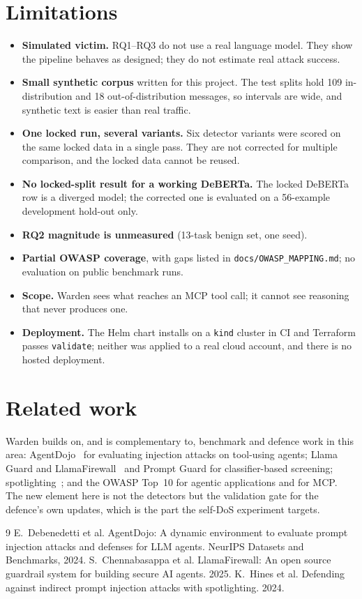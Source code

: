\documentclass[11pt,a4paper]{article}
\begin{document}
\section{Limitations}\label{sec:limits}
\begin{itemize}
  \item \textbf{Simulated victim.} RQ1--RQ3 do not use a real language model. They show the pipeline behaves as designed; they do not estimate real attack success.
  \item \textbf{Small synthetic corpus} written for this project. The test splits hold 109 in-distribution and 18 out-of-distribution messages, so intervals are wide, and synthetic text is easier than real traffic.
  \item \textbf{One locked run, several variants.} Six detector variants were scored on the same locked data in a single pass. They are not corrected for multiple comparison, and the locked data cannot be reused.
  \item \textbf{No locked-split result for a working DeBERTa.} The locked DeBERTa row is a diverged model; the corrected one is evaluated on a 56-example development hold-out only.
  \item \textbf{RQ2 magnitude is unmeasured} (13-task benign set, one seed).
  \item \textbf{Partial OWASP coverage}, with gaps listed in \texttt{docs/OWASP\_MAPPING.md}; no evaluation on public benchmark runs.
  \item \textbf{Scope.} Warden sees what reaches an MCP tool call; it cannot see reasoning that never produces one.
  \item \textbf{Deployment.} The Helm chart installs on a \texttt{kind} cluster in CI and Terraform passes \texttt{validate}; neither was applied to a real cloud account, and there is no hosted deployment.
\end{itemize}

\section{Related work}
Warden builds on, and is complementary to, benchmark and defence work in this area:
AgentDojo~\cite{debenedetti2024agentdojo} for evaluating injection attacks on tool-using agents; Llama Guard and LlamaFirewall~\cite{chennabasappa2025llamafirewall} and Prompt Guard for
classifier-based screening; spotlighting~\cite{hines2024spotlighting}; and the OWASP Top~10 for
agentic applications and for MCP. The new element here is not the detectors but the validation gate
for the defence's own updates, which is the part the self-DoS experiment targets.

\begin{thebibliography}{9}
 E.~Debenedetti et al. AgentDojo: A dynamic environment to evaluate prompt injection attacks and defenses for LLM agents. NeurIPS Datasets and Benchmarks, 2024.
 S.~Chennabasappa et al. LlamaFirewall: An open source guardrail system for building secure AI agents. 2025.
 K.~Hines et al. Defending against indirect prompt injection attacks with spotlighting. 2024.
\end{thebibliography}
\end{document}
